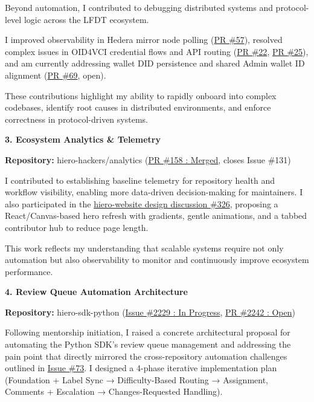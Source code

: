 \documentclass[11pt]{article}
\newcommand{\issueseventythree}{\href{https://github.com/LF-Decentralized-Trust-Mentorships/mentorship-program/issues/73}{Issue \#73}\xspace}
\begin{document}
Beyond automation, I contributed to debugging distributed systems and protocol-level logic across the LFDT ecosystem. 

I improved observability in Hedera mirror node polling (\href{https://github.com/hiero-ledger/hiero-did-sdk-js/pull/57}{PR \#57}), resolved complex issues in OID4VCI credential flows and API routing (\href{https://github.com/hiero-ledger/heka-identity-platform/pull/22}{PR \#22}, \href{https://github.com/hiero-ledger/heka-identity-platform/pull/25}{PR \#25}), and am currently addressing wallet DID persistence and shared Admin wallet ID alignment (\href{https://github.com/hiero-ledger/heka-identity-platform/pull/69}{PR \#69}, open).

These contributions highlight my ability to rapidly onboard into complex codebases, identify root causes in distributed environments, and enforce correctness in protocol-driven systems.

\textbf{3. Ecosystem Analytics \& Telemetry}

\textbf{Repository:} hiero-hackers/analytics (\href{https://github.com/hiero-hackers/analytics/pull/158}{PR \#158 : Merged}, closes Issue \#131)

I contributed to establishing baseline telemetry for repository health and workflow visibility, enabling more data-driven decision-making for maintainers. I also participated in the \href{https://github.com/hiero-ledger/hiero-website/discussions/326}{hiero-website design discussion \#326}, proposing a React/Canvas-based hero refresh with gradients, gentle animations, and a tabbed contributor hub to reduce page length.

This work reflects my understanding that scalable systems require not only automation but also observability to monitor and continuously improve ecosystem performance.

\textbf{4. Review Queue Automation Architecture}

\textbf{Repository:} hiero-sdk-python (\href{https://github.com/hiero-ledger/hiero-sdk-python/issues/2229}{Issue \#2229 : In Progress}, \href{https://github.com/hiero-ledger/hiero-sdk-python/pull/2242}{PR \#2242 : Open})

Following mentorship initiation, I raised a concrete architectural proposal for automating the Python SDK's review queue management and addressing the pain point that directly mirrored the cross-repository automation challenges outlined in \issueseventythree. I designed a 4-phase iterative implementation plan (Foundation + Label Sync → Difficulty-Based Routing → Assignment, Comments + Escalation → Changes-Requested Handling).
\end{document}
